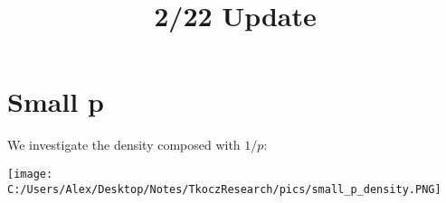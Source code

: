 \documentclass[11pt]{article}
\title{2/22 Update}
\theoremstyle{remark}
\begin{document}
\maketitle

\section{Small p}

We investigate the density composed with $1/p:$

\texttt{[image: C:/Users/Alex/Desktop/Notes/TkoczResearch/pics/small\_p\_density.PNG]}
\end{document}
